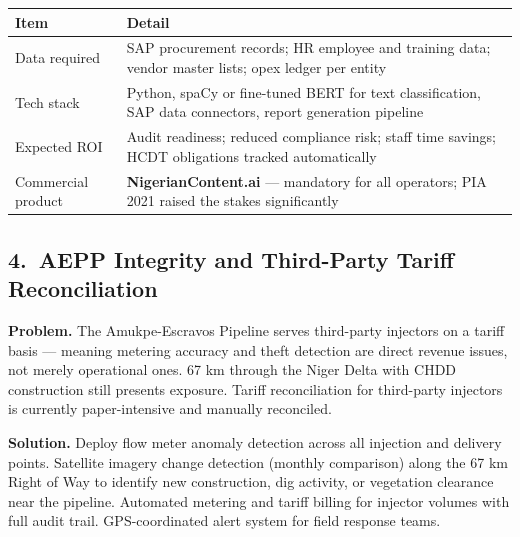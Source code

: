 \documentclass[10pt]{article}
\begin{document}
\vspace{4pt}
\small
\begin{tabularx}{\columnwidth}{@{}lX@{}}
\toprule
\textbf{Item} & \textbf{Detail} \\
\midrule
Data required     & SAP procurement records; HR employee and training data; vendor
                    master lists; opex ledger per entity \\
Tech stack        & Python, spaCy or fine-tuned BERT for text classification,
                    SAP data connectors, report generation pipeline \\
Expected ROI      & Audit readiness; reduced compliance risk; staff time savings;
                    HCDT obligations tracked automatically \\
Commercial product & \textbf{NigerianContent.ai} --- mandatory for all operators;
                    PIA 2021 raised the stakes significantly \\
\bottomrule
\end{tabularx}
\normalsize

\vspace{8pt}

\subsection*{4.\ AEPP Integrity and Third-Party Tariff Reconciliation}

{\small
\textbf{Problem.}
The Amukpe-Escravos Pipeline serves third-party injectors on a tariff basis ---
meaning metering accuracy and theft detection are direct revenue issues, not merely
operational ones. 67 km through the Niger Delta with CHDD construction still presents
exposure. Tariff reconciliation for third-party injectors is currently paper-intensive
and manually reconciled.

\vspace{4pt}
\textbf{Solution.}
Deploy flow meter anomaly detection across all injection and delivery points.
Satellite imagery change detection (monthly comparison) along the 67 km Right of Way
to identify new construction, dig activity, or vegetation clearance near the pipeline.
Automated metering and tariff billing for injector volumes with full audit trail.
GPS-coordinated alert system for field response teams.
}
\end{document}
